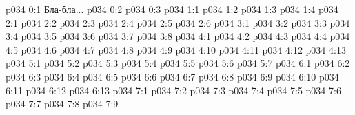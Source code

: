 \author{Могущественный Посланник}
\vs p034 0:1  Бла-бла...
\vs p034 0:2 
\vs p034 0:3 
\vs p034 1:1 
\vs p034 1:2 
\vs p034 1:3 \pc 
\vs p034 1:4 
\vs p034 2:1 
\vs p034 2:2 
\vs p034 2:3 \pc 
\vs p034 2:4 \pc 
\vs p034 2:5 
\vs p034 2:6 \pc 
{}
\vs p034 3:1 
\vs p034 3:2 
\vs p034 3:3 \pc 
\vs p034 3:4 
\vs p034 3:5 \pc 
\vs p034 3:6 
\vs p034 3:7 \pc 
\vs p034 3:8 
\vs p034 4:1 
\vs p034 4:2 
\vs p034 4:3 
\vs p034 4:4 
\vs p034 4:5 \pc 
\vs p034 4:6 
\vs p034 4:7 
\vs p034 4:8 \pc 
\vs p034 4:9 
\vs p034 4:10 \pc 
\vs p034 4:11 \pc 
\vs p034 4:12 
\vs p034 4:13 
\vs p034 5:1 
\vs p034 5:2 
\vs p034 5:3 \pc 
\vs p034 5:4 
\vs p034 5:5 
\vs p034 5:6 \pc 
\vs p034 5:7 
\vs p034 6:1 
\vs p034 6:2 
\vs p034 6:3 \pc 
\vs p034 6:4 
\vs p034 6:5 \pc 
\vs p034 6:6 
\vs p034 6:7 
\vs p034 6:8 
\vs p034 6:9 \pc 
\vs p034 6:10 
\vs p034 6:11 \pc 
\vs p034 6:12 
\vs p034 6:13 
\vs p034 7:1 
\vs p034 7:2 
\vs p034 7:3 
\vs p034 7:4 \pc 
\vs p034 7:5 
\vs p034 7:6 \pc 
\vs p034 7:7 
\vs p034 7:8 \pc 
\vsetoff
\vs p034 7:9 
\quizlink
